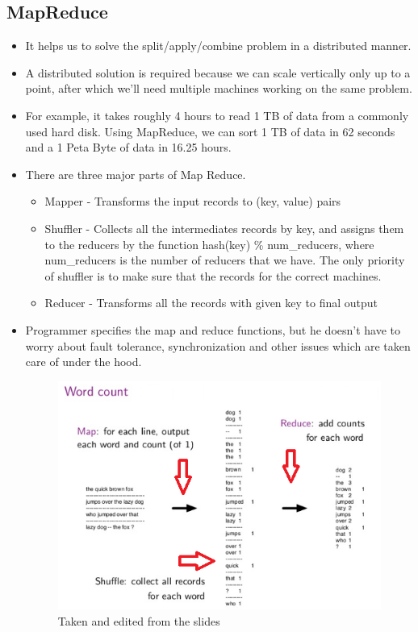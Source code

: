 \documentclass{article}
\begin{document}
\subsection{MapReduce}
\begin{itemize}
    \item It helps us to solve the split/apply/combine problem in a distributed manner.
    \item A distributed solution is required because we can scale vertically only up to a point, after which we'll need multiple machines working on the same problem.
    \item For example, it takes roughly 4 hours to read 1 TB of data from a commonly used hard disk. Using MapReduce, we can sort 1 TB of data in 62 seconds and a 1 Peta Byte of data in 16.25 hours.
    \item There are three major parts of Map Reduce.
    \begin{itemize}
        \item Mapper - Transforms the input records to (key, value) pairs
        \item Shuffler - Collects all the intermediates records by key, and assigns them to the reducers by the function hash(key) \% num\_reducers, where num\_reducers is the number of reducers that we have. The only priority of shuffler is to make sure that the records for the correct machines.
        \item Reducer - Transforms all the records with given key to final output
    \end{itemize}
    \item Programmer specifies the map and reduce functions, but he doesn't have to worry about fault tolerance, synchronization and other issues which are taken care of under the hood.
    \begin{figure}[ht]
    \begin{center}
        \includegraphics[width=1\textwidth]{images/wordcount.png}
        \caption{
            Taken and edited from the slides}
        \label{fig:example_figure}
    \end{center}
    \end{figure}
\end{itemize}
\end{document}

